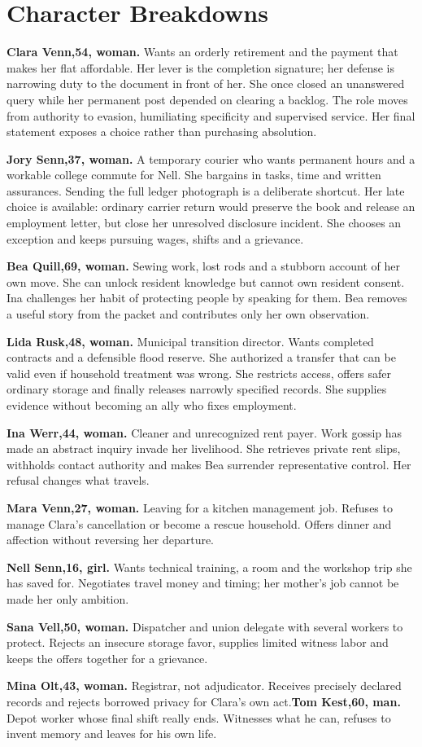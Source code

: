 \section{Character Breakdowns}
\textbf{Clara Venn,54, woman.} Wants an orderly retirement and the payment that makes her flat affordable. Her lever is the completion signature; her defense is narrowing duty to the document in front of her. She once closed an unanswered query while her permanent post depended on clearing a backlog. The role moves from authority to evasion, humiliating specificity and supervised service. Her final statement exposes a choice rather than purchasing absolution.

\textbf{Jory Senn,37, woman.} A temporary courier who wants permanent hours and a workable college commute for Nell. She bargains in tasks, time and written assurances. Sending the full ledger photograph is a deliberate shortcut. Her late choice is available: ordinary carrier return would preserve the book and release an employment letter, but close her unresolved disclosure incident. She chooses an exception and keeps pursuing wages, shifts and a grievance.

\textbf{Bea Quill,69, woman.} Sewing work, lost rods and a stubborn account of her own move. She can unlock resident knowledge but cannot own resident consent. Ina challenges her habit of protecting people by speaking for them. Bea removes a useful story from the packet and contributes only her own observation.

\textbf{Lida Rusk,48, woman.} Municipal transition director. Wants completed contracts and a defensible flood reserve. She authorized a transfer that can be valid even if household treatment was wrong. She restricts access, offers safer ordinary storage and finally releases narrowly specified records. She supplies evidence without becoming an ally who fixes employment.

\textbf{Ina Werr,44, woman.} Cleaner and unrecognized rent payer. Work gossip has made an abstract inquiry invade her livelihood. She retrieves private rent slips, withholds contact authority and makes Bea surrender representative control. Her refusal changes what travels.

\textbf{Mara Venn,27, woman.} Leaving for a kitchen management job. Refuses to manage Clara's cancellation or become a rescue household. Offers dinner and affection without reversing her departure.

\textbf{Nell Senn,16, girl.} Wants technical training, a room and the workshop trip she has saved for. Negotiates travel money and timing; her mother's job cannot be made her only ambition.

\textbf{Sana Vell,50, woman.} Dispatcher and union delegate with several workers to protect. Rejects an insecure storage favor, supplies limited witness labor and keeps the offers together for a grievance.

\textbf{Mina Olt,43, woman.} Registrar, not adjudicator. Receives precisely declared records and rejects borrowed privacy for Clara's own act.\quad\textbf{Tom Kest,60, man.} Depot worker whose final shift really ends. Witnesses what he can, refuses to invent memory and leaves for his own life.
